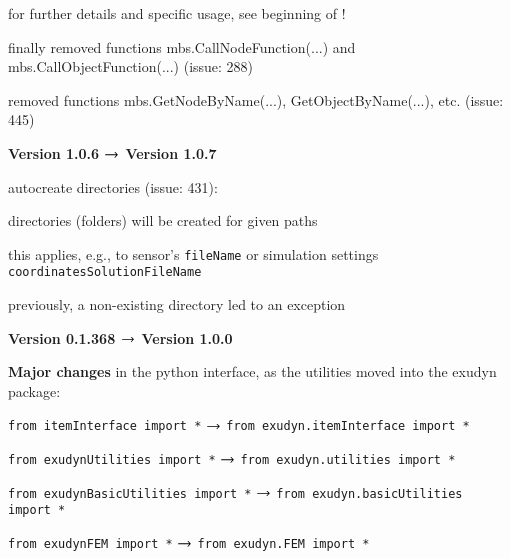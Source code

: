 	\item for further details and specific usage, see beginning of !
	\ei
	\item[] finally removed functions mbs.CallNodeFunction(...) and mbs.CallObjectFunction(...) (issue: 288)
	\item[] removed functions mbs.GetNodeByName(...), GetObjectByName(...), etc. (issue: 445)
	\item {\bf Version 1.0.6 $\rightarrow$ Version 1.0.7}
	\item[] autocreate directories (issue: 431):
	\bi %
	\item directories (folders) will be created for given paths
	\item this applies, e.g., to sensor's \texttt{fileName} or simulation settings \texttt{coordinatesSolutionFileName}
	\item previously, a non-existing directory led to an exception
	\ei
	\item {\bf Version 0.1.368 $\rightarrow$ Version 1.0.0}
	\item[] {\bf Major changes} in the python interface, as the utilities moved into the exudyn package:
	\bi \ttfamily
	  \item \texttt{from itemInterface import *} $\rightarrow$ \texttt{from exudyn.itemInterface import *}
	  \item \texttt{from exudynUtilities import *} $\rightarrow$ \texttt{from exudyn.utilities import *}
	  \item \texttt{from exudynBasicUtilities import *} $\rightarrow$ \texttt{from exudyn.basicUtilities import *}
	  \item \texttt{from exudynFEM import *} $\rightarrow$ \texttt{from exudyn.FEM import *}
